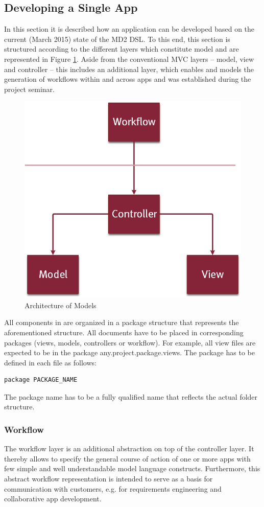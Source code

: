 
\subsection{Developing a Single App} 
\label{subsec:SingleAppDev}
In this section it is described how an application can be developed based on the current (March 2015) state of the MD2 DSL. To this end, this section is structured according to the different layers which constitute \MD model and are represented in Figure \ref{fig:MD2Arch}. Aside from the conventional MVC layers -- model, view and controller -- this includes an additional layer, which enables and models the generation of workflows within and across apps and was established during the project seminar.

\begin{figure}[htb!]
\centering
\includegraphics[width = 0.4\linewidth]{Fig/MD2Arch.png}
\caption{Architecture of \MD Models}
\label{fig:MD2Arch}
\end{figure}

All components in \MD are organized in a package structure that represents the aforementioned structure. All documents have to be placed in corresponding packages (views, models, controllers or workflow). For example, all view files are expected to be in the package any.project.package.views. The package has to be defined in each \MD file as follows:
\begin{lstlisting}
package PACKAGE_NAME
\end{lstlisting}
The package name has to be a fully qualified name that reflects the actual folder structure.

\subsubsection{Workflow} 
\label{subsubsec:Workflow}
The workflow layer is an additional abstraction on top of the controller layer. It thereby allows to specify the general course of action of one or more apps with few simple and well understandable model language constructs. Furthermore, this abstract workflow representation is intended to serve as a basis for communication with customers, e.g. for requirements engineering and collaborative app development.

